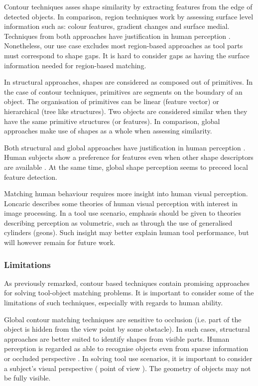 \documentclass{article}
\begin{document}
Contour techniques asses shape similarity by extracting features from the edge of detected objects.
In comparison, region techniques work by assessing surface level information such as: colour features, gradient changes and surface medial.
Techniques from both approaches have justification in human perception \cite{chatbri2016}.
Nonetheless, our use case excludes most region-based approaches as tool parts must correspond to shape gaps.
It is hard to consider gaps as having the surface information needed for region-based matching.

In structural approaches, shapes are considered as composed out of primitives. In the case of contour techniques, primitives are segments on the boundary of an object.
The organisation of primitives can be linear (feature vector\cite{zhang2004}) or hierarchical (tree like structures\cite{zhu2015}).
Two objects are considered similar when they have the same primitive structures (or features).
In comparison, global approaches make use of shapes as a whole when assessing similarity. 

Both structural and global approaches have justification in human perception \cite{zhang2004}.
Human subjects show a preference for features even when other shape descriptors are available \cite{chatbri2016}.
At the same time, global shape perception seems to preceed local feature detection\cite{navon1977}. 

Matching human behaviour requires more insight into human visual perception.
Loncaric\cite{loncaric1998} describes some theories of human visual perception with interest in image processing.
In a tool use scenario, emphasis should be given to theories describing perception as volumetric, such as through the use of generalised cylinders (geons\cite{dickinson2014}).
Such insight may better explain human tool performance, but will however remain for future work.    

\subsubsection{Limitations}
As previously remarked, contour based techniques contain promising approaches for solving tool-object matching problems.
It is important to consider some of the limitations of such techniques, especially with regards to human ability. 

Global contour matching techniques are sensitive to occlusion (i.e. part of the object is hidden from the view point by some obstacle).
In such cases, structural approaches are better suited to identify shapes from visible parts.
Human perception is regarded as able to recognise objects even from sparse information or occluded perspective \cite{loncaric1998}.
In solving tool use scenarios, it is important to consider a subject's visual perspective ( point of view ).
The geometry of objects may not be fully visible. 
\end{document}
